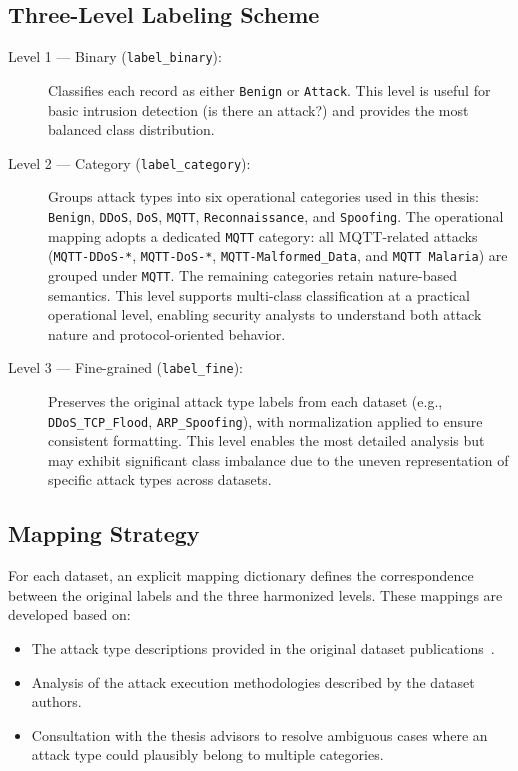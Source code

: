 \subsection{Three-Level Labeling Scheme}
\label{subsec:label-levels}

\begin{description}
    \item[Level 1 --- Binary (\texttt{label\_binary}):] Classifies each record as either \texttt{Benign} or \texttt{Attack}. This level is useful for basic intrusion detection (is there an attack?) and provides the most balanced class distribution.

    \item[Level 2 --- Category (\texttt{label\_category}):] Groups attack types into six operational categories used in this thesis: \texttt{Benign}, \texttt{DDoS}, \texttt{DoS}, \texttt{MQTT}, \texttt{Reconnaissance}, and \texttt{Spoofing}. The operational mapping adopts a dedicated \texttt{MQTT} category: all MQTT-related attacks (\texttt{MQTT-DDoS-*}, \texttt{MQTT-DoS-*}, \texttt{MQTT-Malformed\_Data}, and \texttt{MQTT Malaria}) are grouped under \texttt{MQTT}. The remaining categories retain nature-based semantics. This level supports multi-class classification at a practical operational level, enabling security analysts to understand both attack nature and protocol-oriented behavior.

    \item[Level 3 --- Fine-grained (\texttt{label\_fine}):] Preserves the original attack type labels from each dataset (e.g., \texttt{DDoS\_TCP\_Flood}, \texttt{ARP\_Spoofing}), with normalization applied to ensure consistent formatting. This level enables the most detailed analysis but may exhibit significant class imbalance due to the uneven representation of specific attack types across datasets.
\end{description}

\subsection{Mapping Strategy}
\label{subsec:label-mapping}

For each dataset, an explicit mapping dictionary defines the correspondence between the original labels and the three harmonized levels. These mappings are developed based on:

\begin{itemize}
    \item The attack type descriptions provided in the original dataset publications~\cite{dadkhah2024ciciomt, areia2024iomt}.
    \item Analysis of the attack execution methodologies described by the dataset authors.
    \item Consultation with the thesis advisors to resolve ambiguous cases where an attack type could plausibly belong to multiple categories.
\end{itemize}

